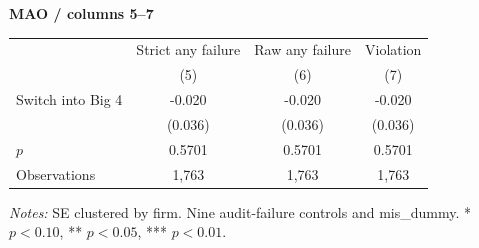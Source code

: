 \documentclass[10pt]{article}
\begin{document}
\medskip\textbf{MAO / columns 5--7}\par\smallskip
\begin{tabular*}{\textwidth}{@{\extracolsep{\fill}}lccc@{}}
\toprule
 & Strict any failure & Raw any failure & Violation \\
 & (5) & (6) & (7) \\
\midrule
Switch into Big 4 & -0.020 & -0.020 & -0.020 \\
 & (0.036) & (0.036) & (0.036) \\
$p$ & 0.5701 & 0.5701 & 0.5701 \\
Observations & 1,763 & 1,763 & 1,763 \\
\bottomrule\end{tabular*}\par
\medskip\fontsize{9}{11}\selectfont\textit{Notes:} SE clustered by firm. Nine audit-failure controls and mis\_dummy. * $p<0.10$, ** $p<0.05$, *** $p<0.01$.
\end{document}

